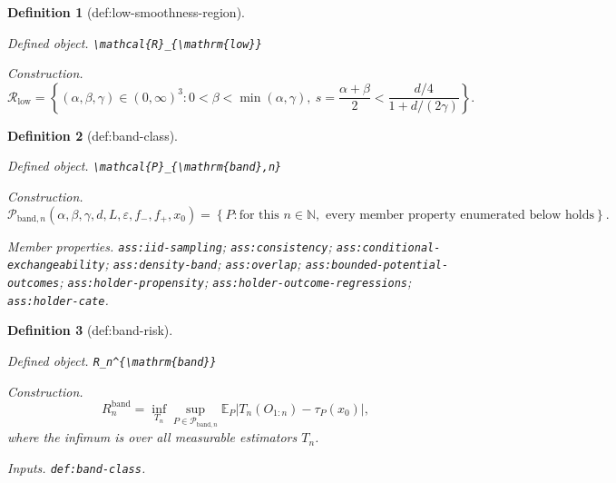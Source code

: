 \documentclass{article}
\newtheorem{definition}{Definition}
\begin{document}
\begin{definition}[def:low-smoothness-region]\label{def:low-smoothness-region}
\par\smallskip\noindent\emph{Defined object.} \texttt{\textbackslash{}\allowbreak{}mathcal\{R\}\allowbreak{}\_\allowbreak{}\{\textbackslash{}\allowbreak{}mathrm\{low\}\allowbreak{}\}\allowbreak{}}
\par\smallskip\noindent\emph{Construction.} \[\mathcal{R}_{\mathrm{low}}=\left\{(\alpha,\beta,\gamma)\in(0,\infty)^3:0<\beta<\min(\alpha,\gamma),\ s=\frac{\alpha+\beta}{2}<\frac{d/4}{1+d/(2\gamma)}\right\}.\]
\end{definition}

\begin{definition}[def:band-class]\label{def:band-class}
\par\smallskip\noindent\emph{Defined object.} \texttt{\textbackslash{}\allowbreak{}mathcal\{P\}\allowbreak{}\_\allowbreak{}\{\textbackslash{}\allowbreak{}mathrm\{band\}\allowbreak{},\allowbreak{}n\}\allowbreak{}}
\par\smallskip\noindent\emph{Construction.} \[\mathcal{P}_{\mathrm{band},n}(\alpha,\beta,\gamma,d,L,\varepsilon,f_{-},f_{+},x_0)=\left\{P:\text{for this }n\in\mathbb{N},\text{ every member property enumerated below holds}\right\}.\]
\par\smallskip\noindent\emph{Member properties.} \texttt{ass:\allowbreak{}iid-\allowbreak{}sampling}; \texttt{ass:\allowbreak{}consistency}; \texttt{ass:\allowbreak{}conditional-\allowbreak{}exchangeability}; \texttt{ass:\allowbreak{}density-\allowbreak{}band}; \texttt{ass:\allowbreak{}overlap}; \texttt{ass:\allowbreak{}bounded-\allowbreak{}potential-\allowbreak{}outcomes}; \texttt{ass:\allowbreak{}holder-\allowbreak{}propensity}; \texttt{ass:\allowbreak{}holder-\allowbreak{}outcome-\allowbreak{}regressions}; \texttt{ass:\allowbreak{}holder-\allowbreak{}cate}.
\end{definition}

\begin{definition}[def:band-risk]\label{def:band-risk}
\par\smallskip\noindent\emph{Defined object.} \texttt{R\_\allowbreak{}n\textasciicircum{}\{\textbackslash{}\allowbreak{}mathrm\{band\}\allowbreak{}\}\allowbreak{}}
\par\smallskip\noindent\emph{Construction.} \[R_n^{\mathrm{band}}=\inf_{T_n}\sup_{P\in\mathcal{P}_{\mathrm{band},n}}\mathbb{E}_P\left|T_n(O_{1:n})-\tau_P(x_0)\right|,\] where the infimum is over all measurable estimators \(T_n\).
\par\smallskip\noindent\emph{Inputs.} \texttt{def:\allowbreak{}band-\allowbreak{}class}.
\end{definition}
\end{document}
